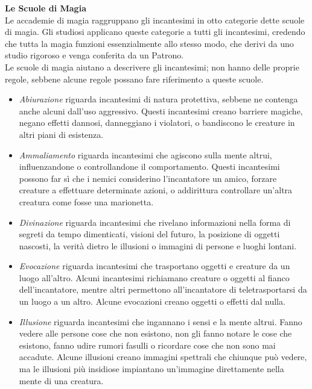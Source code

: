 \textbf{Le Scuole di Magia}\\
Le accademie di magia raggruppano gli incantesimi in otto categorie dette scuole di magia. Gli studiosi applicano queste categorie a tutti gli incantesimi, credendo che tutta la magia funzioni essenzialmente allo stesso  modo, che derivi da uno studio rigoroso e venga conferita da un Patrono.\\
Le scuole di magia aiutano a descrivere gli incantesimi; non  hanno delle proprie regole, sebbene alcune regole possano fare riferimento a queste scuole.\\

\begin{itemize}
\item
\textit{Abiurazione} riguarda incantesimi di natura protettiva, sebbene  ne contenga anche alcuni dall'uso aggressivo. Questi incantesimi  creano barriere magiche, negano effetti dannosi, danneggiano i  violatori, o bandiscono le creature in altri piani di esistenza.\\
\item
\textit{Ammaliamento} riguarda incantesimi che agiscono sulla mente altrui, influenzandone o controllandone il comportamento. Questi incantesimi possono far sì che i nemici considerino l’incantatore  un amico, forzare creature a effettuare determinate azioni, o  addirittura controllare un'altra creatura come fosse una marionetta.\\
\item
\textit{Divinazione} riguarda incantesimi che rivelano informazioni nella forma di segreti da tempo dimenticati, visioni del futuro, la  posizione di oggetti nascosti, la verità dietro le illusioni o  immagini di persone e luoghi lontani.\\
\item
\textit{Evocazione} riguarda incantesimi che trasportano oggetti e  creature da un luogo all'altro. Alcuni incantesimi richiamano  creature o oggetti al fianco dell'incantatore, mentre altri  permettono all'incantatore di teletrasportarsi da un luogo a un altro. Alcune evocazioni creano oggetti o effetti dal nulla. \\
\item
\textit{Illusione} riguarda incantesimi che ingannano i sensi e la mente  altrui. Fanno vedere alle persone cose che non esistono, non gli  fanno notare le cose che esistono, fanno udire rumori fasulli o  ricordare cose che non sono mai accadute. Alcune illusioni  creano immagini spettrali che chiunque può vedere, ma le  illusioni più insidiose impiantano un'immagine direttamente nella mente di una creatura.\\

\end{itemize}
